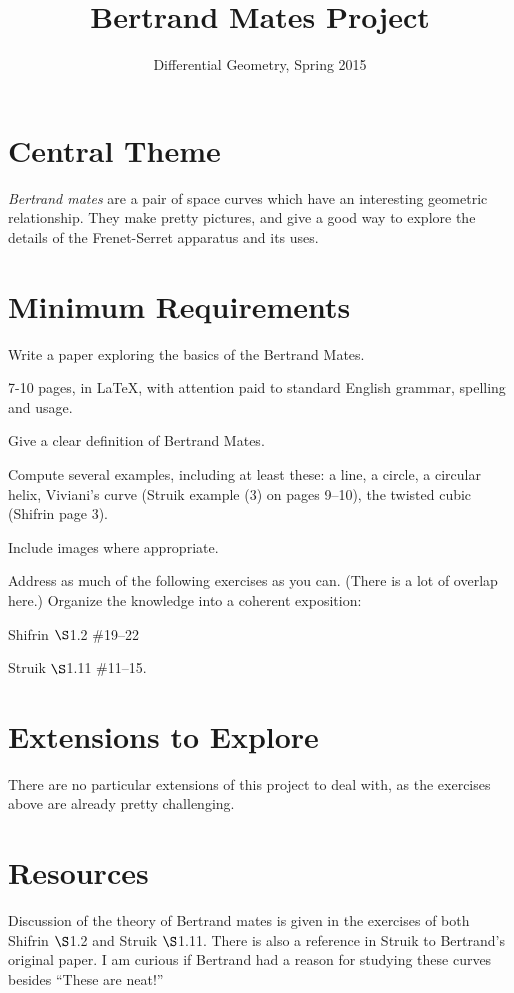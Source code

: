 \documentclass[12pt]{amsart}
\begin{document}
\title{Bertrand Mates Project}
\author{Differential Geometry, Spring 2015}

\maketitle

\section*{Central Theme}

\emph{Bertrand mates} are a pair of space curves which have an interesting geometric 
relationship. They make pretty pictures, and give a good way to explore the details of the Frenet-Serret apparatus and its uses.

\section*{Minimum Requirements}

Write a paper exploring the basics of the Bertrand Mates. 
\begin{compactitem}
\item 7-10 pages, in \LaTeX, with attention paid to standard English grammar, spelling and usage.
\item Give a clear definition of Bertrand Mates.
\item Compute several examples, including at least these: a line, a circle, a circular helix, Viviani's curve (Struik example (3) on pages 9--10), the twisted cubic (Shifrin page 3).
\item Include images where appropriate.
\item Address as much of the following exercises as you can. (There is a lot of overlap here.) Organize the knowledge into a coherent exposition:
\begin{compactenum}
\item Shifrin $\S$1.2 \#19--22
\item Struik $\S$1.11 \#11--15.
\end{compactenum}
\end{compactitem}


\section*{Extensions to Explore}

There are no particular extensions of this project to deal with, as the exercises above are already pretty challenging. 

\section*{Resources}

Discussion of the theory of Bertrand mates is given in the exercises of both Shifrin $\S$1.2 and Struik $\S$1.11. There is also a reference in Struik to Bertrand's original paper. I am curious if Bertrand had a reason for studying these curves besides ``These are neat!''
\end{document}
